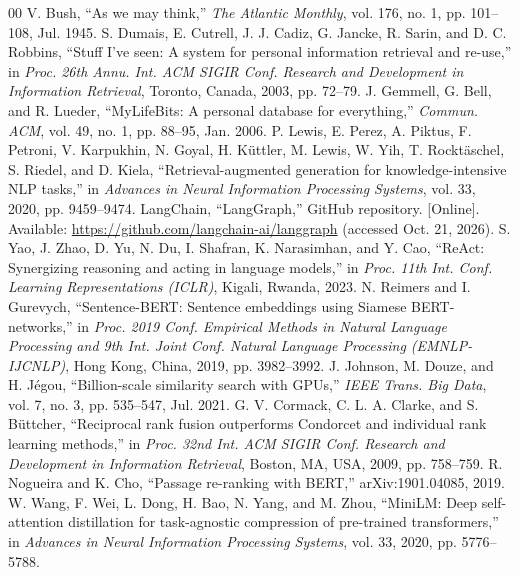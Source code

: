 \documentclass[conference]{IEEEtran}
\begin{document}
\begin{thebibliography}{00}
 V. Bush, ``As we may think,'' \textit{The Atlantic Monthly}, vol. 176, no. 1, pp. 101--108, Jul. 1945.
 S. Dumais, E. Cutrell, J. J. Cadiz, G. Jancke, R. Sarin, and D. C. Robbins, ``Stuff I've seen: A system for personal information retrieval and re-use,'' in \textit{Proc. 26th Annu. Int. ACM SIGIR Conf. Research and Development in Information Retrieval}, Toronto, Canada, 2003, pp. 72--79.
 J. Gemmell, G. Bell, and R. Lueder, ``MyLifeBits: A personal database for everything,'' \textit{Commun. ACM}, vol. 49, no. 1, pp. 88--95, Jan. 2006.
 P. Lewis, E. Perez, A. Piktus, F. Petroni, V. Karpukhin, N. Goyal, H. K\"{u}ttler, M. Lewis, W. Yih, T. Rockt\"{a}schel, S. Riedel, and D. Kiela, ``Retrieval-augmented generation for knowledge-intensive NLP tasks,'' in \textit{Advances in Neural Information Processing Systems}, vol. 33, 2020, pp. 9459--9474.
 LangChain, ``LangGraph,'' GitHub repository. [Online]. Available: \url{https://github.com/langchain-ai/langgraph} (accessed Oct. 21, 2026).
 S. Yao, J. Zhao, D. Yu, N. Du, I. Shafran, K. Narasimhan, and Y. Cao, ``ReAct: Synergizing reasoning and acting in language models,'' in \textit{Proc. 11th Int. Conf. Learning Representations (ICLR)}, Kigali, Rwanda, 2023.
 N. Reimers and I. Gurevych, ``Sentence-BERT: Sentence embeddings using Siamese BERT-networks,'' in \textit{Proc. 2019 Conf. Empirical Methods in Natural Language Processing and 9th Int. Joint Conf. Natural Language Processing (EMNLP-IJCNLP)}, Hong Kong, China, 2019, pp. 3982--3992.
 J. Johnson, M. Douze, and H. J\'{e}gou, ``Billion-scale similarity search with GPUs,'' \textit{IEEE Trans. Big Data}, vol. 7, no. 3, pp. 535--547, Jul. 2021.
 G. V. Cormack, C. L. A. Clarke, and S. B\"{u}ttcher, ``Reciprocal rank fusion outperforms Condorcet and individual rank learning methods,'' in \textit{Proc. 32nd Int. ACM SIGIR Conf. Research and Development in Information Retrieval}, Boston, MA, USA, 2009, pp. 758--759.
 R. Nogueira and K. Cho, ``Passage re-ranking with BERT,'' arXiv:1901.04085, 2019.
 W. Wang, F. Wei, L. Dong, H. Bao, N. Yang, and M. Zhou, ``MiniLM: Deep self-attention distillation for task-agnostic compression of pre-trained transformers,'' in \textit{Advances in Neural Information Processing Systems}, vol. 33, 2020, pp. 5776--5788.

\end{thebibliography}
\end{document}
